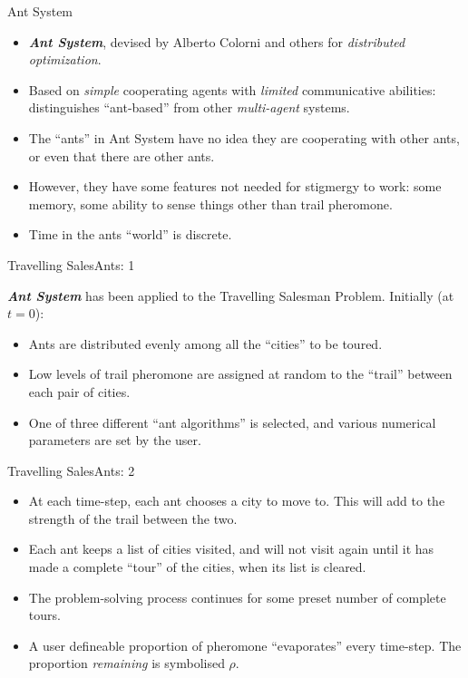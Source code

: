 \documentclass{article}
\begin{document}
\begin{slide}{}
{\Large Ant System}
\begin{itemize}
\item {\em {\bf Ant System}}, devised by Alberto Colorni and others
for {\em distributed optimization}.
\item Based on {\em simple} cooperating agents with {\em limited}
communicative abilities: distinguishes ``ant-based''
from other {\em multi-agent} systems.
\item The ``ants'' in Ant System have no idea they are cooperating
with other ants, or even that there are other ants.
\item However, they have some features not needed for stigmergy to
work: some memory, some ability to
sense things other than trail pheromone. 
\item Time in the ants ``world'' is discrete.
\end{itemize}
\end{slide}

\begin{slide}{}
{\Large Travelling SalesAnts: 1}

{\em {\bf Ant System}} has been applied to the Travelling
Salesman Problem. Initially (at $t=0$):
\begin{itemize}
\item Ants are distributed evenly among all the ``cities''
to be toured.
\item Low levels of trail pheromone are assigned at random to the
``trail'' between each pair of cities.
\item One of three different ``ant algorithms'' is selected, and various
numerical parameters are set by the user.
\end{itemize}
\end{slide}

\begin{slide}{}
{\Large Travelling SalesAnts: 2}
\begin{itemize}
\item At each time-step, each ant chooses a city to move to. This will add to
the strength of the trail between the two.
\item Each ant keeps a list of cities visited, and will not visit
again until it has made a complete ``tour'' of the cities, when its list is
cleared.
\item The problem-solving process continues for some preset
number of complete tours.
\item A user defineable proportion of pheromone ``evaporates'' every
time-step. The proportion {\em remaining} is symbolised $\rho$.
\end{itemize}
\end{slide}
\end{document}
